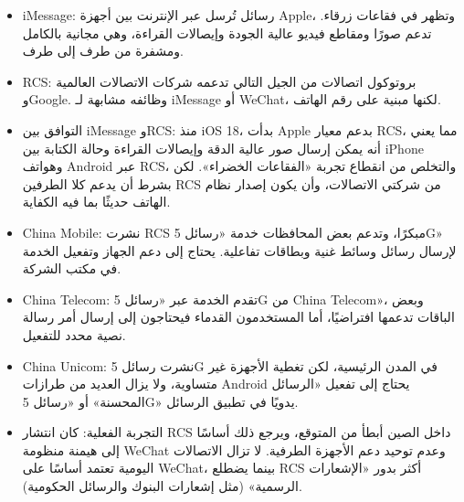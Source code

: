 \begin{itemize}
  \item iMessage: رسائل تُرسل عبر الإنترنت بين أجهزة Apple، وتظهر في فقاعات زرقاء. تدعم صورًا ومقاطع فيديو عالية الجودة وإيصالات القراءة، وهي مجانية بالكامل ومشفرة من طرف إلى طرف.
  \item RCS: بروتوكول اتصالات من الجيل التالي تدعمه شركات الاتصالات العالمية وGoogle. وظائفه مشابهة لـ iMessage أو WeChat، لكنها مبنية على رقم الهاتف.
  \item التوافق بين iMessage وRCS: منذ iOS 18، بدأت Apple بدعم معيار RCS، مما يعني أنه يمكن إرسال صور عالية الدقة وإيصالات القراءة وحالة الكتابة بين iPhone وهواتف Android عبر RCS، والتخلص من انقطاع تجربة «الفقاعات الخضراء». لكن بشرط أن يدعم كلا الطرفين RCS من شركتي الاتصالات، وأن يكون إصدار نظام الهاتف حديثًا بما فيه الكفاية.
\end{itemize}


\begin{itemize}
  \item China Mobile: نشرت RCS مبكرًا، وتدعم بعض المحافظات خدمة «رسائل 5G» لإرسال رسائل وسائط غنية وبطاقات تفاعلية. يحتاج إلى دعم الجهاز وتفعيل الخدمة في مكتب الشركة.
  \item China Telecom: تقدم الخدمة عبر «رسائل 5G من China Telecom»، وبعض الباقات تدعمها افتراضيًا، أما المستخدمون القدماء فيحتاجون إلى إرسال أمر رسالة نصية محدد للتفعيل.
  \item China Unicom: نشرت رسائل 5G في المدن الرئيسية، لكن تغطية الأجهزة غير متساوية، ولا يزال العديد من طرازات Android يحتاج إلى تفعيل «الرسائل المحسنة» أو «رسائل 5G» يدويًا في تطبيق الرسائل.
  \item التجربة الفعلية: كان انتشار RCS داخل الصين أبطأ من المتوقع، ويرجع ذلك أساسًا إلى هيمنة منظومة WeChat وعدم توحيد دعم الأجهزة الطرفية. لا تزال الاتصالات اليومية تعتمد أساسًا على WeChat، بينما يضطلع RCS أكثر بدور «الإشعارات الرسمية» (مثل إشعارات البنوك والرسائل الحكومية).
\end{itemize}

